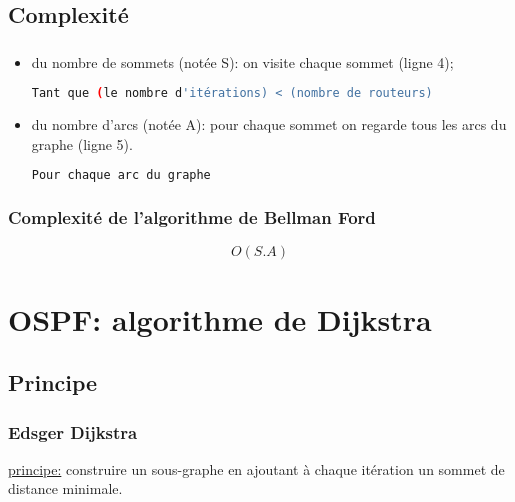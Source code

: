 \documentclass[svgnames,11pt]{beamer}
\begin{document}
\subsection{Complexité}
\begin{frame}[fragile]
    \frametitle{}

    \begin{itemize}
        \item<1-> du nombre de sommets (notée S): on visite chaque sommet (ligne 4);
        \begin{lstlisting}[language=bash]
Tant que (le nombre d'itérations) < (nombre de routeurs)
        \end{lstlisting}
        \item<2-> du nombre d'arcs (notée A): pour chaque sommet on regarde tous les arcs du graphe (ligne 5).
        \begin{lstlisting}[language=bash]
Pour chaque arc du graphe
        \end{lstlisting}
    \end{itemize}

\end{frame}
\begin{frame}
    \frametitle{Complexité de l'algorithme de Bellman Ford}

    {\LARGE$$O(S.A)$$}

\end{frame}

\section{OSPF: algorithme de Dijkstra}
\subsection{Principe}
\begin{frame}
    \frametitle{Edsger Dijkstra}

    \underline{principe:} construire un sous-graphe en ajoutant à chaque itération un sommet de distance minimale.

\end{frame}
\end{document}
